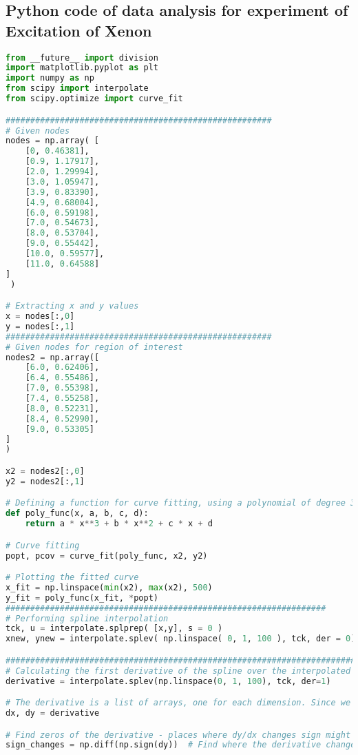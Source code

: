 \documentclass[a4paper,11pt]{article}
\begin{document}
\subsection*{Python code of data analysis for experiment of Excitation of Xenon}
\begin{lstlisting}[language=Python]
from __future__ import division
import matplotlib.pyplot as plt
import numpy as np
from scipy import interpolate
from scipy.optimize import curve_fit

######################################################
# Given nodes
nodes = np.array( [
    [0, 0.46381],
    [0.9, 1.17917],
    [2.0, 1.29994],
    [3.0, 1.05947],
    [3.9, 0.83390],
    [4.9, 0.68004],
    [6.0, 0.59198],
    [7.0, 0.54673],
    [8.0, 0.53704],
    [9.0, 0.55442],
    [10.0, 0.59577],
    [11.0, 0.64588]
]
 )

# Extracting x and y values
x = nodes[:,0]
y = nodes[:,1]
######################################################
# Given nodes for region of interest
nodes2 = np.array([
    [6.0, 0.62406],
    [6.4, 0.55486],
    [7.0, 0.55398],
    [7.4, 0.55258],
    [8.0, 0.52231],
    [8.4, 0.52990],
    [9.0, 0.53305]
]
)

x2 = nodes2[:,0]
y2 = nodes2[:,1]

# Defining a function for curve fitting, using a polynomial of degree 3 as an example
def poly_func(x, a, b, c, d):
    return a * x**3 + b * x**2 + c * x + d

# Curve fitting
popt, pcov = curve_fit(poly_func, x2, y2)

# Plotting the fitted curve
x_fit = np.linspace(min(x2), max(x2), 500)
y_fit = poly_func(x_fit, *popt)
#################################################################
# Performing spline interpolation
tck, u = interpolate.splprep( [x,y], s = 0 )
xnew, ynew = interpolate.splev( np.linspace( 0, 1, 100 ), tck, der = 0)

#######################################################################
# Calculating the first derivative of the spline over the interpolated range
derivative = interpolate.splev(np.linspace(0, 1, 100), tck, der=1)

# The derivative is a list of arrays, one for each dimension. Since we're working in 1D, we only need the first array.
dx, dy = derivative

# Find zeros of the derivative - places where dy/dx changes sign might indicate local minima or maxima
sign_changes = np.diff(np.sign(dy))  # Find where the derivative changes sign


\end{lstlisting}
\end{document}
